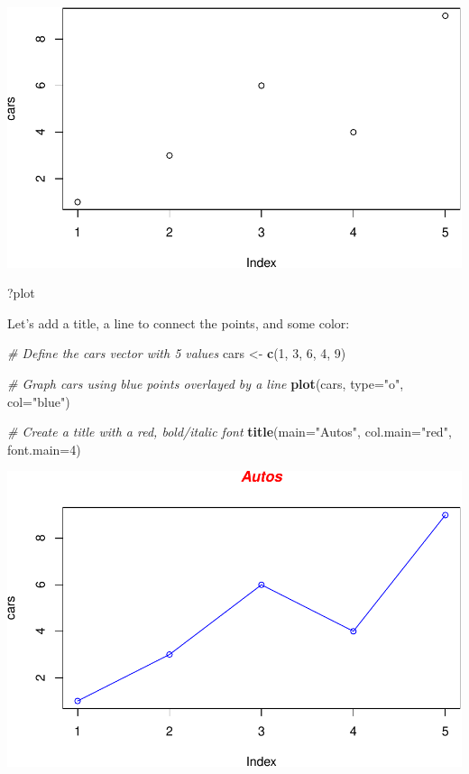 \documentclass[]{book}
\makeatletter
\newenvironment{Shaded}{\begin{snugshade}}{\end{snugshade}}
\newcommand{\CommentTok}[1]{\textcolor[rgb]{0.56,0.35,0.01}{\textit{#1}}}
\newcommand{\DataTypeTok}[1]{\textcolor[rgb]{0.13,0.29,0.53}{#1}}
\newcommand{\DecValTok}[1]{\textcolor[rgb]{0.00,0.00,0.81}{#1}}
\newcommand{\KeywordTok}[1]{\textcolor[rgb]{0.13,0.29,0.53}{\textbf{#1}}}
\newcommand{\NormalTok}[1]{#1}
\newcommand{\StringTok}[1]{\textcolor[rgb]{0.31,0.60,0.02}{#1}}
\newenvironment{kframe}{%
\medskip{}
\setlength{\fboxsep}{.8em}
 \def\at@end@of@kframe{}%
 \ifinner\ifhmode%
  \def\at@end@of@kframe{\end{minipage}}%
  \begin{minipage}{\columnwidth}%
 \fi\fi%
 \def\FrameCommand##1{\hskip\@totalleftmargin \hskip-\fboxsep
 \colorbox{shadecolor}{##1}\hskip-\fboxsep
     \hskip-\linewidth \hskip-\@totalleftmargin \hskip\columnwidth}%
 \MakeFramed {\advance\hsize-\width
   \@totalleftmargin\z@ \linewidth\hsize
   \@setminipage}}%
 {\par\unskip\endMakeFramed%
 \at@end@of@kframe}
\renewenvironment{Shaded}{\begin{kframe}}{\end{kframe}}
\makeatother
\begin{document}
\includegraphics{bioinfBookXIE186_files/figure-latex/unnamed-chunk-92-1.pdf}

\begin{Shaded}
\begin{Highlighting}[]
\NormalTok{?plot}
\end{Highlighting}
\end{Shaded}

Let's add a title, a line to connect the points, and some color:

\begin{Shaded}
\begin{Highlighting}[]
\CommentTok{# Define the cars vector with 5 values}
\NormalTok{cars <-}\StringTok{ }\KeywordTok{c}\NormalTok{(}\DecValTok{1}\NormalTok{, }\DecValTok{3}\NormalTok{, }\DecValTok{6}\NormalTok{, }\DecValTok{4}\NormalTok{, }\DecValTok{9}\NormalTok{)}

\CommentTok{# Graph cars using blue points overlayed by a line }
\KeywordTok{plot}\NormalTok{(cars, }\DataTypeTok{type=}\StringTok{"o"}\NormalTok{, }\DataTypeTok{col=}\StringTok{"blue"}\NormalTok{)}

\CommentTok{# Create a title with a red, bold/italic font}
\KeywordTok{title}\NormalTok{(}\DataTypeTok{main=}\StringTok{"Autos"}\NormalTok{, }\DataTypeTok{col.main=}\StringTok{"red"}\NormalTok{, }\DataTypeTok{font.main=}\DecValTok{4}\NormalTok{)}
\end{Highlighting}
\end{Shaded}

\includegraphics{bioinfBookXIE186_files/figure-latex/unnamed-chunk-93-1.pdf}
\end{document}
